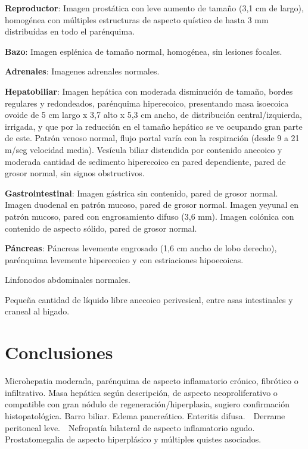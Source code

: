 \documentclass{article}
\begin{document}
\textbf{Reproductor}: Imagen prostática con leve aumento de tamaño (3,1 cm de largo), homogénea con múltiples estructuras de aspecto quístico de hasta 3 mm distribuídas en todo el parénquima.

\textbf{Bazo}: Imagen esplénica de tamaño normal, homogénea, sin lesiones focales.

\textbf{Adrenales}: Imagenes adrenales normales.

\textbf{Hepatobiliar}: Imagen hepática con moderada disminución de tamaño, bordes regulares y redondeados, parénquima hiperecoico, presentando masa isoecoica ovoide de 5 cm largo x 3,7 alto x 5,3 cm ancho, de distribución central/izquierda, irrigada, y que por la reducción en el tamaño hepático se ve ocupando gran parte de este. Patrón venoso normal, flujo portal varía con la respiración (desde 9 a 21 m/seg velocidad media). Vesícula biliar distendida por contenido anecoico y moderada cantidad de sedimento hiperecoico en pared dependiente, pared de grosor normal, sin signos obstructivos.

\textbf{Gastrointestinal}: Imagen gástrica sin contenido, pared de grosor normal. Imagen duodenal en patrón mucoso, pared de grosor normal. Imagen yeyunal en patrón mucoso, pared con engrosamiento difuso (3,6 mm). Imagen colónica con contenido de aspecto sólido, pared de grosor normal.

\textbf{Páncreas}: Páncreas levemente engrosado (1,6 cm ancho de lobo derecho), parénquima levemente hiperecoico y con estriaciones hipoecoicas. 

Linfonodos abdominales normales.

Pequeña cantidad de líquido libre anecoico perivesical, entre asas intestinales y craneal al higado.


\section*{Conclusiones}
Microhepatia moderada, parénquima de aspecto inflamatorio crónico, fibrótico o infiltrativo. Masa hepática según descripción, de aspecto neoproliferativo o compatible con gran nódulo de regeneración/hiperplasia, sugiero confirmación histopatológica. Barro biliar. Edema pancreático. Enteritis difusa.  Derrame peritoneal leve.  Nefropatía bilateral de aspecto inflamatorio agudo. Prostatomegalia de aspecto hiperplásico y múltiples quistes asociados.

\vfill
\end{document}

